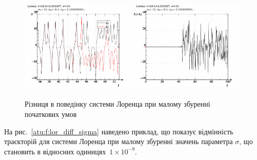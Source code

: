 \begin{figure}[htb!]
  \begin{center}
    \includegraphics[width=0.49\textwidth]{p/lor_diff-p_xx_x0.png}
    \hfill
    \includegraphics[width=0.49\textwidth]{p/lor_diff-p_dx_x0.png}
  \end{center}
\caption{Різниця в поведінку системи Лоренца при малому збуренні початкових умов}
\label{atu:f:lor_diff_x0}
\end{figure}


На рис.~\ref{atu:f:lor_diff_sigma} наведено приклад, що показує відмінність
траєкторій для системи Лоренца при малому збуренні значень
параметра
$ \sigma $, що становить в відносних одиницях~$ 1 \times 10^{-9} $.


